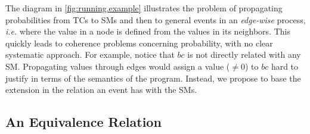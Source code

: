 \documentclass{tlp}
\begin{document}
The diagram in \cref{fig:running.example} illustrates the problem of
propagating probabilities from \aclp{TC} to \aclp{SM} and then to
general events in an \emph{edge-wise} process, \emph{i.e.} where the
value in a node is defined from the values in its neighbors.  This
quickly leads to coherence problems concerning probability, with no
clear systematic approach.  For example, notice that \(bc\) is not
directly related with any \acl{SM}.  Propagating values through edges
would assign a value (\(\not= 0\)) to \(bc\) hard to justify in terms
of the semantics of the program.  Instead, we propose to base the
extension in the relation an event has with the \aclp{SM}.
%
%
%
\subsection{An Equivalence Relation}
\label{subsec:equivalence.relation}
%
%
%
\end{document}
